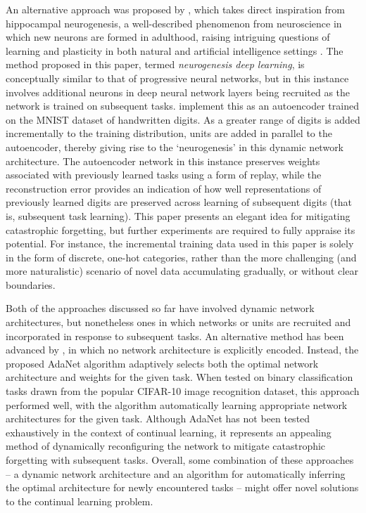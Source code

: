 \documentclass{article} %
\begin{document}
An alternative approach was proposed by \citet{draelos2017neurogenesis}, which takes direct inspiration from hippocampal neurogenesis, a well-described phenomenon from neuroscience in which new neurons are formed in adulthood, raising intriguing questions of learning and plasticity in both natural and artificial intelligence settings \citep{aimone2014regulation}. The method proposed in this paper, termed \textit{neurogenesis deep learning}, is conceptually similar to that of progressive neural networks, but in this instance involves additional neurons in deep neural network layers being recruited as the network is trained on subsequent tasks. \citet{draelos2017neurogenesis} implement this as an autoencoder trained on the MNIST dataset of handwritten digits. As a greater range of digits is added incrementally to the training distribution, units are added in parallel to the autoencoder, thereby giving rise to the ‘neurogenesis’ in this dynamic network architecture. The autoencoder network in this instance preserves weights associated with previously learned tasks using a form of replay, while the reconstruction error provides an indication of how well representations of previously learned digits are preserved across learning of subsequent digits (that is, subsequent task learning). This paper presents an elegant idea for mitigating catastrophic forgetting, but further experiments are required to fully appraise its potential. For instance, the incremental training data used in this paper is solely in the form of discrete, one-hot categories, rather than the more challenging (and more naturalistic) scenario of novel data accumulating gradually, or without clear boundaries.

Both of the approaches discussed so far have involved dynamic network architectures, but nonetheless ones in which networks or units are recruited and incorporated in response to subsequent tasks. An alternative method has been advanced by \citet{cortes2017adanet}, in which no network architecture is explicitly encoded. Instead, the proposed AdaNet algorithm adaptively selects both the optimal network architecture and weights for the given task. When tested on binary classification tasks drawn from the popular CIFAR-10 image recognition dataset, this approach performed well, with the algorithm automatically learning appropriate network architectures for the given task. Although AdaNet has not been tested exhaustively in the context of continual learning, it represents an appealing method of dynamically reconfiguring the network to mitigate catastrophic forgetting with subsequent tasks. Overall, some combination of these approaches – a dynamic network architecture and an algorithm for automatically inferring the optimal architecture for newly encountered tasks – might offer novel solutions to the continual learning problem.
\end{document}
